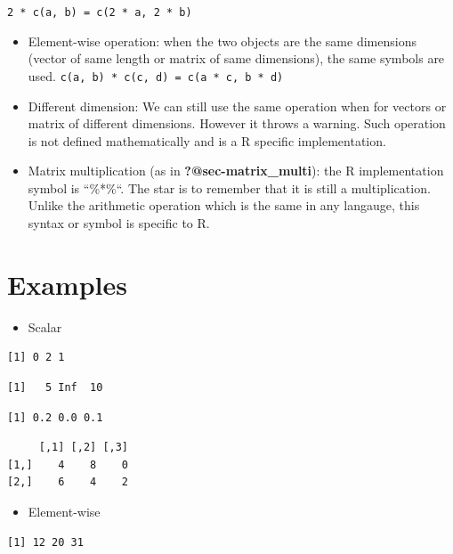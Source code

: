 \documentclass[
  letterpaper,
  DIV=11,
  numbers=noendperiod]{scrreprt}
\providecommand{\tightlist}{%
  \setlength{\itemsep}{0pt}\setlength{\parskip}{0pt}}
\begin{document}
\texttt{2\ *\ c(a,\ b)\ =\ c(2\ *\ a,\ 2\ *\ b)}

\begin{itemize}
\item
  Element-wise operation: when the two objects are the same dimensions
  (vector of same length or matrix of same dimensions), the same symbols
  are used. \texttt{c(a,\ b)\ *\ c(c,\ d)\ =\ c(a\ *\ c,\ b\ *\ d)}
\item
  Different dimension: We can still use the same operation when for
  vectors or matrix of different dimensions. However it throws a
  warning. Such operation is not defined mathematically and is a R
  specific implementation.
\item
  Matrix multiplication (as in \textbf{?@sec-matrix\_multi}): the R
  implementation symbol is ``\%*\%``. The star is to remember that it is
  still a multiplication. Unlike the arithmetic operation which is the
  same in any langauge, this syntax or symbol is specific to R.
\end{itemize}

\section*{Examples}\label{examples-35}


\begin{itemize}
\tightlist
\item
  Scalar
\end{itemize}

\begin{verbatim}
[1] 0 2 1
\end{verbatim}

\begin{verbatim}
[1]   5 Inf  10
\end{verbatim}

\begin{verbatim}
[1] 0.2 0.0 0.1
\end{verbatim}

\begin{verbatim}
     [,1] [,2] [,3]
[1,]    4    8    0
[2,]    6    4    2
\end{verbatim}

\begin{itemize}
\tightlist
\item
  Element-wise
\end{itemize}

\begin{verbatim}
[1] 12 20 31
\end{verbatim}
\end{document}
